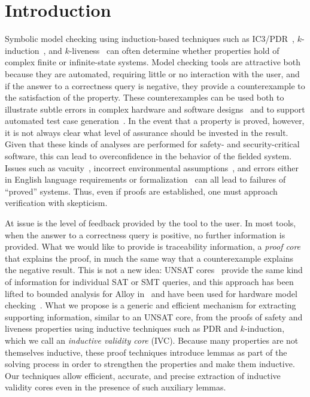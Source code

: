 \section{Introduction}
\label{sec:intro}

Symbolic model checking using induction-based techniques such as IC3/PDR~\cite{Een2011:PDR}, $k$-induction~\cite{SheeranSS00}, and $k$-liveness~\cite{conf/fmcad/ClaessenS12} can often determine whether properties hold of complex finite or infinite-state systems.    Model checking tools are attractive both because they are automated, requiring little or no interaction with the user, and if the answer to a correctness query is negative, they provide a counterexample to the satisfaction of the property.  These counterexamples can be used both to illustrate subtle errors in complex hardware and software designs~\cite{hilt2013,McMillan99:compositional, Miller10:CACM} and to support automated test case generation~\cite{Whalen13:OMCDC, You15:dse}.
In the event that a property is proved, however, it is not always clear what level of assurance should be invested in the result.  Given that these kinds of analyses are performed for safety- and security-critical software, this can lead to overconfidence in the behavior of the fielded system.  Issues such as vacuity~\cite{Kupferman03:Vacuity}, incorrect environmental assumptions~\cite{Whalen07:FMICS}, and errors either in English language requirements or formalization~\cite{Pike06:axioms} can all lead to failures of ``proved'' systems.  Thus, even if proofs are established, one must approach verification with skepticism.

At issue is the level of feedback provided by the tool to the user. In most tools, when the answer to a correctness query is positive, no further information is provided. What we would like to provide is traceability information, a {\em proof core} that explains the proof, in much the same way that a counterexample explains the
negative result. This is not a new idea: UNSAT cores~\cite{zhang2003extracting} provide the same kind of information for individual SAT or
SMT queries, and this approach has been lifted to bounded analysis
for Alloy in~\cite{Torlak08:cores} and have been used for hardware model checking~\cite{jasper_gold}. What we propose is a generic and efficient
mechanism for extracting supporting information, similar to an UNSAT
core, from the proofs of safety and liveness properties using inductive techniques
such as PDR and $k$-induction, which we call an {\em inductive validity core} (IVC). Because many properties are not themselves inductive, these proof techniques introduce lemmas as part of the solving process in order to strengthen the properties and make them inductive. Our techniques allow efficient, accurate, and precise extraction of inductive validity cores even in the presence of such auxiliary lemmas.

